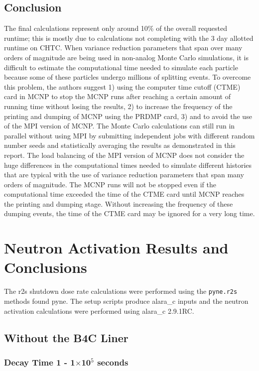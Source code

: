 \documentclass[12pt]{article}
\begin{document}
\subsection{Conclusion}
The final calculations represent only around 10\% of the overall requested 
runtime; this is mostly due to calculations not completing with the 3 day 
allotted runtime on CHTC. When variance reduction parameters that span over
 many orders of magnitude are being used in non-analog Monte Carlo simulations,
 it is difficult to estimate the computational time needed to simulate each 
particle because some of these particles undergo millions of splitting events. 
To overcome this problem, the authors suggest 1) using the computer time cutoff
 (CTME) card in MCNP to stop the MCNP runs after reaching a certain amount of 
running time without losing the results, 2) to increase the frequency of the 
printing and dumping of MCNP using the PRDMP card, 3) and to avoid the use of 
the MPI version of MCNP. The Monte Carlo calculations can still run in parallel
 without using MPI by submitting independent jobs with different random number 
seeds and statistically averaging the results as demonstrated in this report. 
The load balancing of the MPI  version of MCNP does not consider the huge 
differences in the computational times needed to simulate different histories
 that are typical with the use of variance reduction parameters that span many 
orders of magnitude. The MCNP runs will not be stopped even if the computational
 time exceeded the time of the  CTME card until MCNP reaches the printing and 
dumping stage. Without increasing the frequency of these dumping events, the 
time of the CTME card may be ignored for a very long time.

\newpage
\clearpage

\section{Neutron Activation Results and Conclusions}
The \gls{r2s} shutdown dose rate calculations were performed using the
\texttt{pyne.r2s} methods found \gls{pyne}. The setup scripts produce
\gls{alara_c} inputs and the neutron activation calculations were performed
using \gls{alara_c} 2.9.1RC. 
\subsection{Without the B4C Liner}
\subsubsection{Decay Time 1 - 1$\times$10$^{5}$ seconds}

\clearpage
\end{document}
